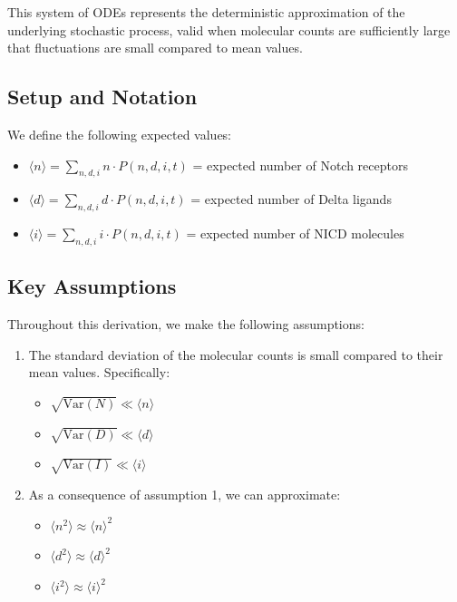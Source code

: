 \documentclass{article}
\begin{document}
\begin{flushleft}
This system of ODEs represents the deterministic approximation of the underlying stochastic process, valid when molecular counts are sufficiently large that fluctuations are small compared to mean values.

\subsection*{Setup and Notation}

We define the following expected values:
\begin{itemize}
  \item $\langle n \rangle = \sum_{n,d,i} n \cdot P(n,d,i,t)$ = expected number of Notch receptors
  \item $\langle d \rangle = \sum_{n,d,i} d \cdot P(n,d,i,t)$ = expected number of Delta ligands
  \item $\langle i \rangle = \sum_{n,d,i} i \cdot P(n,d,i,t)$ = expected number of NICD molecules
\end{itemize}

\subsection*{Key Assumptions}

Throughout this derivation, we make the following assumptions:

\begin{enumerate}
  \item The standard deviation of the molecular counts is small compared to their mean values. Specifically:
  \begin{itemize}
    \item $\sqrt{\text{Var}(N)} \ll \langle n \rangle$
    \item $\sqrt{\text{Var}(D)} \ll \langle d \rangle$
    \item $\sqrt{\text{Var}(I)} \ll \langle i \rangle$
  \end{itemize}
  
  \item As a consequence of assumption 1, we can approximate:
  \begin{itemize}
    \item $\langle n^2 \rangle \approx \langle n \rangle^2$
    \item $\langle d^2 \rangle \approx \langle d \rangle^2$
    \item $\langle i^2 \rangle \approx \langle i \rangle^2$
  \end{itemize}
  

\end{enumerate}
\end{flushleft}
\end{document}
